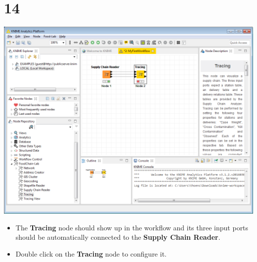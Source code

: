 \documentclass[10pt]{beamer}
\begin{document}
\section{14}
\begin{frame}
	\begin{center}
  		\includegraphics[height=0.6\textheight]{14.png}
	\end{center}
	\begin{itemize}
		\item The \textbf{Tracing} node should show up in the workflow and its three input ports should be automatically connected to the \textbf{Supply Chain Reader}.
		\item Double click on the \textbf{Tracing} node to configure it.
	\end{itemize}
\end{frame}
\end{document}
